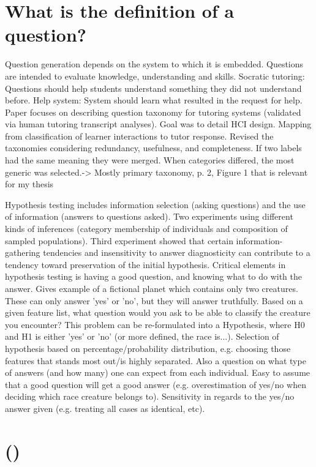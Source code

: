 \section{What is the definition of a question?}
\label{sec:question_definition}
Question generation depends on the system to which it is embedded. Questions are intended to evaluate knowledge, understanding and skills. Socratic tutoring: Questions should help students understand something they did not understand before. Help system: System should learn what resulted in the request for help. Paper focuses on describing question taxonomy for tutoring systems (validated via human tutoring transcript analyses). Goal was to detail HCI design. Mapping from classification of learner interactions to tutor response. Revised the taxonomies considering redundancy, usefulness, and completeness. If two labels had the same meaning they were merged. When categories differed, the most generic was selected.-> Mostly primary taxonomy, p. 2, Figure 1 that is relevant for my thesis
\cite{Nielsen2008}

Hypothesis testing includes information selection (asking questions) and the use of information (answers to questions asked). Two experiments using different kinds of inferences (category membership of individuals and composition of sampled populations). Third experiment showed that certain information-gathering tendencies and insensitivity to answer diagnosticity can contribute to a tendency toward preservation of the initial hypothesis. 
Critical elements in hypothesis testing is having a good question, and knowing what to do with the answer. Gives example of a fictional planet which contains only two creatures. These can only answer 'yes' or 'no', but they will answer truthfully. Based on a given feature list, what question would you ask to be able to classify the creature you encounter? 
This problem can be re-formulated into a Hypothesis, where H0 and H1 is either 'yes' or 'no' (or more defined, the race is...). Selection of hypothesis based on percentage/probability distribution, e.g. choosing those features that stands most out/is highly separated. Also a question on what type of answers (and how many) one can expect from each individual. Easy to assume that a good question will get a good answer (e.g. overestimation of yes/no when deciding which race creature belongs to). Sensitivity in regards to the yes/no answer given (e.g. treating all cases as identical, etc).
\cite{Slowiaczek1992}

\section{ ()}
\label{sec:question_answering}

